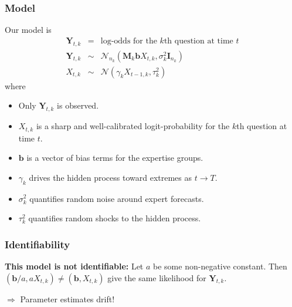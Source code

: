 \documentclass{beamer}
\begin{document}
\begin{frame}
\frametitle{Model}
Our model is
\begin{eqnarray*}
\boldsymbol{Y}_{t,k}  &=& \text{log-odds for the $k$th question at time }t\\
\boldsymbol{Y}_{t,k}  &\sim&  \mathcal{N}_{n_k}\left( \boldsymbol{M}_k \boldsymbol{b} X_{t,k}, \sigma^2_k\boldsymbol{I}_{n_k} \right)\\
X_{t,k} &\sim& \mathcal{N} \left( \gamma_k X_{t-1,k}, \tau^2_k\right)
\end{eqnarray*}
where
\begin{itemize}
\item Only $\boldsymbol{Y}_{t,k}$ is observed.
\item $X_{t,k}$ is a sharp and well-calibrated logit-probability for the $k$th question at time $t$.
\item $\boldsymbol{b}$ is a vector of bias terms for the expertise groups.
\item $\gamma_k$ drives the hidden process toward extremes as $t \to T$. 
\item $\sigma^2_k$ quantifies random noise around expert forecasts. 
\item $\tau^2_k$ quantifies random shocks to the hidden process.
\end{itemize}

\end{frame}
%
\begin{frame}
\frametitle{Identifiability}
\textbf{This model is not identifiable:} Let $a$ be some non-negative constant. Then  $(\boldsymbol{b}/a, aX_{t,k}) \neq (\boldsymbol{b}, X_{t,k})$ give the same likelihood for $\boldsymbol{Y}_{t,k}$. 

\vspace{1em}
$\Rightarrow$ Parameter estimates drift!
\end{frame}
 
\end{document}
